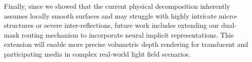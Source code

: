 \documentclass[lettersize,journal]{IEEEtran}
\begin{document}
Finally, since we showed that the current physical decomposition inherently assumes locally smooth surfaces and may struggle with highly intricate micro-structures or severe inter-reflections, future work includes extending our dual-mask routing mechanism to incorporate neural implicit representations. This extension will enable more precise volumetric depth rendering for translucent and participating media in complex real-world light field scenarios.




\end{document}
